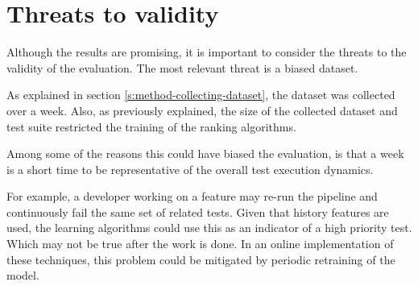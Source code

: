 \section{Threats to validity}\label{s:conclusion-threats}

Although the results are promising, it is important to consider
the threats to the validity of the evaluation. The most relevant threat 
is a biased dataset.

As explained in section \ref{s:method-collecting-dataset}, the dataset was 
collected over a week. Also, as previously explained, the size of 
the collected dataset and test suite restricted the training of the ranking
algorithms.

Among some of the reasons this could have biased the evaluation, is that
a week is a short time to be representative of the overall test execution dynamics.

For example, a developer working on a feature may re-run the pipeline and continuously
fail the same set of related tests. Given that history features are used, the learning algorithms
could use this as an indicator of a high priority test. Which may not be true after the 
work is done. In an online implementation of these techniques, this problem
could be mitigated by periodic retraining of the model.
